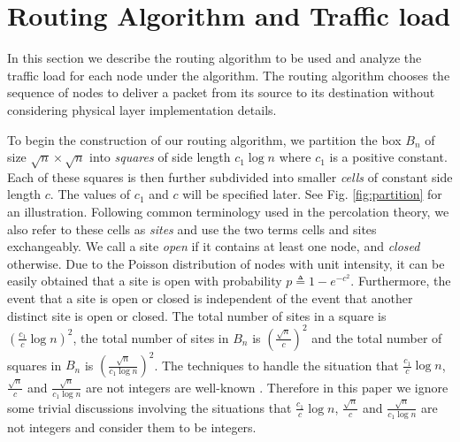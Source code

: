 \documentclass[english]{IEEEtran}
\theoremstyle{plain}
\theoremstyle{plain}
\theoremstyle{plain}
\theoremstyle{remark}
\begin{document}
\section{Routing Algorithm and Traffic load\label{sec:Routing Scheme}}

In this section we describe the routing algorithm to be used and analyze
the traffic load for each node under the algorithm. The routing algorithm
chooses the sequence of nodes to deliver a packet from its source
to its destination without considering physical layer implementation
details.

To begin the construction of our routing algorithm, we partition the
box $B_{n}$ of size $\sqrt{n}\times\sqrt{n}$ into \emph{squares}
of side length $c_{1}\log n$ where $c_{1}$ is a positive constant.
Each of these squares is then further subdivided into smaller \emph{cells}
of constant side length $c$. The values of $c_{1}$ and $c$ will
be specified later. See Fig. \ref{fig:partition} for an illustration.
Following common terminology used in the percolation theory, we also
refer to these cells as \emph{sites} and use the two terms cells and
sites exchangeably. We call a site \emph{open} if it contains at least
one node, and \emph{closed} otherwise. Due to the Poisson distribution
of nodes with unit intensity, it can be easily obtained that a site
is open with probability $p\triangleq1-e^{-c^{2}}$. Furthermore,
the event that a site is open or closed is independent of the event
that another distinct site is open or closed. The total number of
sites in a square is $\left(\frac{c_{1}}{c}\log n\right)^{2}$, the
total number of sites in $B_{n}$ is $\left(\frac{\sqrt{n}}{c}\right)^{2}$
and the total number of squares in $B_{n}$ is $\left(\frac{\sqrt{n}}{c_{1}\log n}\right)^{2}$.
The techniques to handle the situation that $\frac{c_{1}}{c}\log n$,
$\frac{\sqrt{n}}{c}$ and $\frac{\sqrt{n}}{c_{1}\log n}$ are not
integers are well-known \cite{Franceschetti07Closing}. Therefore
in this paper we ignore some trivial discussions involving the situations
that $\frac{c_{1}}{c}\log n$, $\frac{\sqrt{n}}{c}$ and $\frac{\sqrt{n}}{c_{1}\log n}$
are not integers and consider them to be integers.
\end{document}

